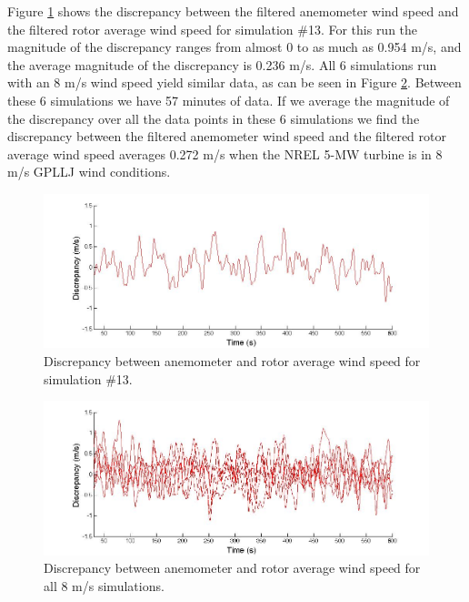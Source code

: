 Figure \ref{fig2-9} shows the discrepancy between the filtered anemometer wind speed and the filtered rotor average wind speed for simulation \#13. For this run the magnitude of the discrepancy ranges from almost 0 to as much as 0.954 m/s, and the average magnitude of the discrepancy is 0.236 m/s. All 6 simulations run with an 8 m/s wind speed yield similar data, as can be seen in Figure \ref{fig2-10}. Between these 6 simulations we have 57 minutes of data. If we average the magnitude of the discrepancy over all the data points in these 6 simulations we find the discrepancy between the filtered anemometer wind speed and the filtered rotor average wind speed averages 0.272 m/s when the NREL 5-MW turbine is in 8 m/s GPLLJ wind conditions.

\begin{figure}[htbp]
	\centering
		\includegraphics[width = \linewidth]{Figures/ch2Figures/fig2-9.jpg}
		
	\caption{Discrepancy between anemometer and rotor average wind speed for simulation \#13.}
	\label{fig2-9}
\end{figure}

\begin{figure}[htbp]
	\centering
		\includegraphics[trim = {.25cm 0 2.5cm 0}, clip, width = .95\linewidth]{Figures/ch2Figures/fig2-10.jpg}
		
	\caption{Discrepancy between anemometer and rotor average wind speed for all 8 m/s simulations.}
	\label{fig2-10}
\end{figure}


